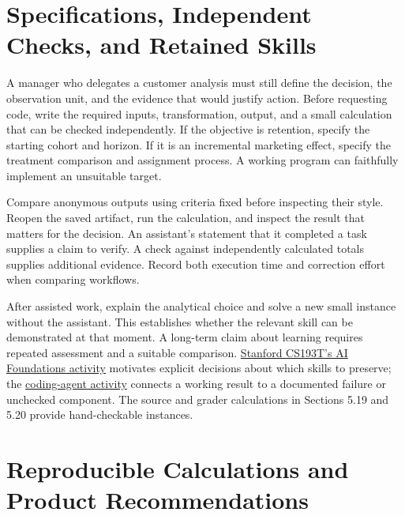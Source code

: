\hypertarget{M01-specifications-independent-checks-and-retained-skills}{%
\section{Specifications, Independent Checks, and Retained
Skills}\label{M01-specifications-independent-checks-and-retained-skills}}

\noindent \noindent A manager who delegates a customer analysis must still define
the decision, the observation unit, and the evidence that would justify
action. Before requesting code, write the required inputs,
transformation, output, and a small calculation that can be checked
independently. If the objective is retention, specify the starting
cohort and horizon. If it is an incremental marketing effect, specify
the treatment comparison and assignment process. A working program can
faithfully implement an unsuitable target.

Compare anonymous outputs using criteria fixed before inspecting their
style. Reopen the saved artifact, run the calculation, and inspect the
result that matters for the decision. An assistant's statement that it
completed a task supplies a claim to verify. A check against
independently calculated totals supplies additional evidence. Record
both execution time and correction effort when comparing workflows.

After assisted work, explain the analytical choice and solve a new small
instance without the assistant. This establishes whether the relevant
skill can be demonstrated at that moment. A long-term claim about
learning requires repeated assessment and a suitable comparison.
\href{https://web.stanford.edu/class/archive/cs/cs193t/cs193t.1272/assignments/1-ai-foundations/}{Stanford
CS193T's AI Foundations activity} motivates explicit decisions about
which skills to preserve; the
\href{https://web.stanford.edu/class/archive/cs/cs193t/cs193t.1272/assignments/6-coding-agents/}{coding-agent
activity} connects a working result to a documented failure or unchecked
component. The source and grader calculations in Sections 5.19 and 5.20
provide hand-checkable instances.

\hypertarget{M01-reproducible-calculations-and-product-recommendations}{%
\section{Reproducible Calculations and Product
Recommendations}\label{M01-reproducible-calculations-and-product-recommendations}}

